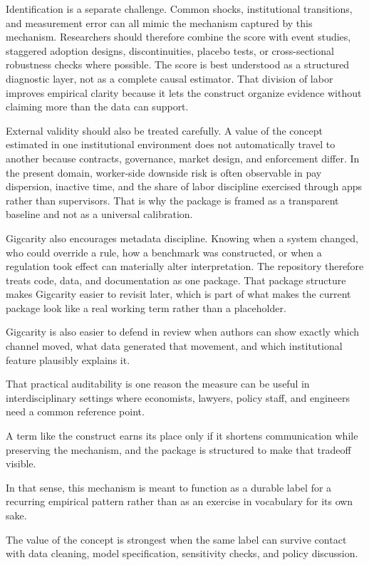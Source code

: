 \documentclass[12pt]{article}
\begin{document}
Identification is a separate challenge. Common shocks, institutional transitions, and measurement error can all mimic the mechanism captured by this mechanism. Researchers should therefore combine the score with event studies, staggered adoption designs, discontinuities, placebo tests, or cross-sectional robustness checks where possible. The score is best understood as a structured diagnostic layer, not as a complete causal estimator. That division of labor improves empirical clarity because it lets the construct organize evidence without claiming more than the data can support.

External validity should also be treated carefully. A value of the concept estimated in one institutional environment does not automatically travel to another because contracts, governance, market design, and enforcement differ. In the present domain, worker-side downside risk is often observable in pay dispersion, inactive time, and the share of labor discipline exercised through apps rather than supervisors. That is why the package is framed as a transparent baseline and not as a universal calibration.

Gigcarity also encourages metadata discipline. Knowing when a system changed, who could override a rule, how a benchmark was constructed, or when a regulation took effect can materially alter interpretation. The repository therefore treats code, data, and documentation as one package. That package structure makes Gigcarity easier to revisit later, which is part of what makes the current package look like a real working term rather than a placeholder.

Gigcarity is also easier to defend in review when authors can show exactly which channel moved, what data generated that movement, and which institutional feature plausibly explains it.

That practical auditability is one reason the measure can be useful in interdisciplinary settings where economists, lawyers, policy staff, and engineers need a common reference point.

A term like the construct earns its place only if it shortens communication while preserving the mechanism, and the package is structured to make that tradeoff visible.

In that sense, this mechanism is meant to function as a durable label for a recurring empirical pattern rather than as an exercise in vocabulary for its own sake.

The value of the concept is strongest when the same label can survive contact with data cleaning, model specification, sensitivity checks, and policy discussion.
\end{document}

